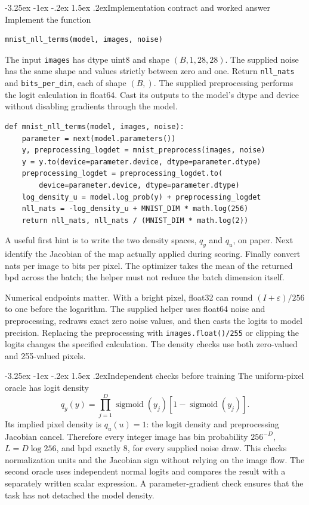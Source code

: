 \documentclass[11pt,a4paper]{article}
\makeatletter
\renewcommand\subsection{\@startsection{subsection}{2}{\z@}%
  {-3.25ex \@plus -1ex \@minus -.2ex}%
  {1.5ex \@plus .2ex}{\normalfont\large}}
\makeatother
\begin{document}
\subsection{Implementation contract and worked answer}
Implement the function
\begin{lstlisting}
mnist_nll_terms(model, images, noise)
\end{lstlisting}
The input \texttt{images} has dtype uint8 and shape $(B,1,28,28)$.
The supplied noise has the same shape and values strictly between zero and
one. Return \texttt{nll\_nats} and \texttt{bits\_per\_dim}, each of shape $(B,)$.
The supplied preprocessing performs the logit calculation in float64. Cast
its outputs to the model's dtype and device without disabling gradients
through the model.

\begin{lstlisting}
def mnist_nll_terms(model, images, noise):
    parameter = next(model.parameters())
    y, preprocessing_logdet = mnist_preprocess(images, noise)
    y = y.to(device=parameter.device, dtype=parameter.dtype)
    preprocessing_logdet = preprocessing_logdet.to(
        device=parameter.device, dtype=parameter.dtype)
    log_density_u = model.log_prob(y) + preprocessing_logdet
    nll_nats = -log_density_u + MNIST_DIM * math.log(256)
    return nll_nats, nll_nats / (MNIST_DIM * math.log(2))
\end{lstlisting}

A useful first hint is to write the two density spaces, $q_y$ and $q_u$, on
paper. Next identify the Jacobian of the map actually applied during scoring.
Finally convert nats per image to bits per pixel. The optimizer takes the
mean of the returned bpd across the batch; the helper must not reduce the
batch dimension itself.

Numerical endpoints matter. With a bright pixel, float32 can round
$(I+\varepsilon)/256$ to one before the logarithm. The supplied helper uses
float64 noise and preprocessing, redraws exact zero noise values, and then
casts the logits to model precision. Replacing the preprocessing with
\texttt{images.float()/255} or clipping the logits changes the specified
calculation. The density checks use both zero-valued and 255-valued pixels.

\subsection{Independent checks before training}
The uniform-pixel oracle has logit density
\[
 q_y(y)=\prod_{j=1}^D\operatorname{sigmoid}(y_j)
                        [1-\operatorname{sigmoid}(y_j)].
\]
Its implied pixel density is $q_u(u)=1$: the logit density and preprocessing
Jacobian cancel. Therefore every integer image has bin probability $256^{-D}$,
$L=D\log256$, and bpd exactly 8, for every supplied noise draw. This checks
normalization units and the Jacobian sign without relying on the image flow.
The second oracle uses independent normal logits and compares the result
with a separately written scalar expression. A parameter-gradient check
ensures that the task has not detached the model density.
\end{document}
